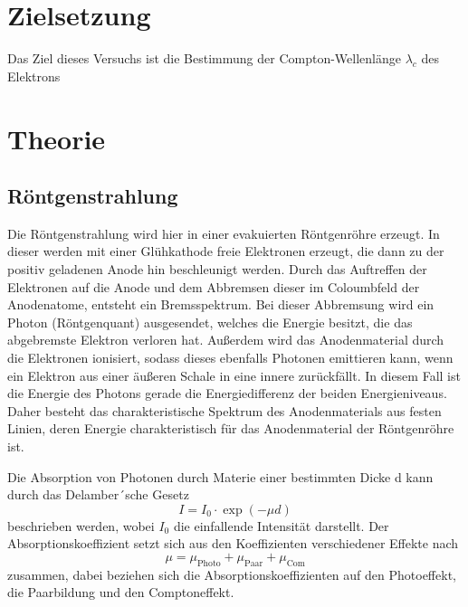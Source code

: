 \section*{Zielsetzung}
Das Ziel dieses Versuchs ist die Bestimmung der Compton-Wellenlänge $\lambda_c$ des Elektrons
\section{Theorie}
\label{sec:Theorie}
\subsection{Röntgenstrahlung}
Die Röntgenstrahlung wird hier in einer evakuierten Röntgenröhre erzeugt.
In dieser werden mit einer Glühkathode freie Elektronen erzeugt, die dann zu der positiv geladenen Anode hin beschleunigt werden.
Durch das Auftreffen der Elektronen auf die Anode und dem Abbremsen dieser im Coloumbfeld der Anodenatome, entsteht ein Bremsspektrum. Bei dieser Abbremsung wird ein Photon (Röntgenquant) ausgesendet, welches die Energie besitzt, die das abgebremste Elektron verloren hat.
Außerdem wird das Anodenmaterial durch die Elektronen ionisiert,
sodass dieses ebenfalls Photonen emittieren kann, wenn ein Elektron aus einer äußeren Schale in eine innere zurückfällt.
In diesem Fall ist die Energie des Photons gerade
die Energiedifferenz der beiden Energieniveaus. Daher besteht das charakteristische Spektrum des Anodenmaterials aus festen Linien, deren Energie charakteristisch für das Anodenmaterial der
Röntgenröhre ist. \newline

\noindent Die Absorption von Photonen durch Materie einer bestimmten Dicke d kann durch das Delamber´sche Gesetz
\begin{equation}
    I = I_0 \cdot \exp{(-\mu d)} 
\end{equation}
beschrieben werden, wobei $I_0$ die einfallende Intensität darstellt.
\noindent Der Absorptionskoeffizient setzt sich aus den Koeffizienten verschiedener Effekte nach
\begin{equation}
    \mu = \mu_\text{Photo} + \mu_\text{Paar} + \mu_\text{Com}
\end{equation}
zusammen, dabei beziehen sich die Absorptionskoeffizienten auf den Photoeffekt, die Paarbildung und den Comptoneffekt.
